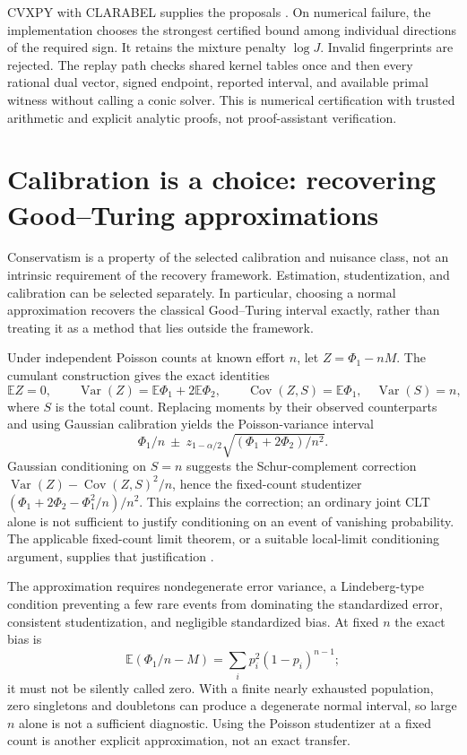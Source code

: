 \documentclass[11pt]{article}
\theoremstyle{remark}\newtheorem{remark}[theorem]{Remark}
\newcommand{\E}{\mathbb E}\newcommand{\PP}{\mathbb P}
\begin{document}
CVXPY with CLARABEL supplies the proposals \cite{CVXPY,Clarabel}. On numerical
failure, the implementation chooses the strongest certified bound among
individual directions of the required sign. It retains the mixture penalty
$\log J$. Invalid fingerprints are rejected. The replay path checks shared
kernel tables once and then every rational dual vector, signed endpoint,
reported interval, and available primal witness without calling a conic solver.
This is numerical certification with trusted arithmetic and explicit analytic
proofs, not proof-assistant verification.

\section{Calibration is a choice: recovering Good--Turing approximations}
Conservatism is a property of the selected calibration and nuisance class, not
an intrinsic requirement of the recovery framework. Estimation, studentization,
and calibration can be selected separately. In particular, choosing a normal
approximation recovers the classical Good--Turing interval exactly, rather
than treating it as a method that lies outside the framework.

Under independent Poisson counts at known effort $n$, let $Z=\Phi_1-nM$.
The cumulant construction gives the exact identities
\[
 \E Z=0,\qquad
 \operatorname{Var}(Z)=\E\Phi_1+2\E\Phi_2,\qquad
 \operatorname{Cov}(Z,S)=\E\Phi_1,\quad \operatorname{Var}(S)=n,
\]
where $S$ is the total count. Replacing moments by their observed counterparts
and using Gaussian calibration yields the Poisson-variance interval
\[
 \Phi_1/n\ \pm\ z_{1-\alpha/2}\sqrt{(\Phi_1+2\Phi_2)/n^2}.
\]
Gaussian conditioning on $S=n$ suggests the Schur-complement correction
$\operatorname{Var}(Z)-\operatorname{Cov}(Z,S)^2/n$, hence the fixed-count
studentizer $(\Phi_1+2\Phi_2-\Phi_1^2/n)/n^2$. This explains the correction;
an ordinary joint CLT alone is not sufficient to justify conditioning on an
event of vanishing probability. The applicable fixed-count limit theorem,
or a suitable local-limit conditioning argument, supplies that justification
\cite{Esty1983,ZhangZhang2009}.

The approximation requires nondegenerate error variance, a Lindeberg-type
condition preventing a few rare events from dominating the standardized
error, consistent studentization, and negligible standardized bias. At fixed
$n$ the exact bias is
\[
 \E(\Phi_1/n-M)=\sum_i p_i^2(1-p_i)^{n-1};
\]
it must not be silently called zero. With a finite nearly exhausted population,
zero singletons and doubletons can produce a degenerate normal interval, so
large $n$ alone is not a sufficient diagnostic. Using the Poisson studentizer
at a fixed count is another explicit approximation, not an exact transfer.
\end{document}
